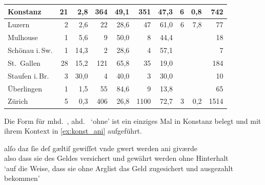 \begin{table}
\begin{tabular}{
	l @{\qquad}
	r r @{\qquad}
	r r @{\qquad}
	r r @{\qquad}
	r r @{\qquad}
	r}
\midrule

Konstanz
	& 21 	& 2,8
	& 364	& 49,1
	& 351	& 47,3
	& 6		& 0,8
	& 742
	\\

\midrule

Luzern
	& 2		& 2,6
	& 22	& 28,6
	& 47	& 61,0
	& 6		& 7,8
	& 77
	\\

\midrule

Mulhouse
	& 1	& 5,6
	& 9	& 50,0
	& 8	& 44,4
	&	&
	& 18
	\\

\midrule

Schönau i.\,Sw.
	& 1	& 14,3
	& 2	& 28,6
	& 4	& 57,1
	&	&
	& 7
	\\

\midrule

St.~Gallen
	& 28	& 15,2
	& 121	& 65,8
	& 35	& 19,0
	&		&
	& 184
	\\

\midrule

Staufen i.\,Br.
	& 3 & 30,0
	& 4	& 40,0
	& 3	& 30,0
	&	&
	& 10
	\\

\midrule

Überlingen
	& 1		& 1,5	
	& 55	& 84,6
	& 9		& 13,8
	&		&
	& 65
	\\

\midrule

Zürich
	& 5		& 0,3
	& 406	& 26,8
	& 1100	& 72,7
	& 3		& 0,2
	& 1514
	\\



\bottomrule
\end{tabular}
\label{tab:ispelx}
\end{table}

Die Form  für mhd.~, ahd.~ `ohne' ist ein einziges
Mal in Konstanz belegt und mit ihrem Kontext in \cref{ex:konst_ani} aufgeführt.

\begin{exe}
\ex\label{ex:konst_ani}
	\gll alſo daz ſie deſ gæltiſ gewiſſet vnde gwert werden ani giværde \\
		also dass sie des Geldes versichert und gewährt werden ohne
			Hinterhalt \\
	\trans `auf die Weise, dass sie ohne Arglist das Geld zugesichert und
		ausgezahlt bekommen'
		\parencites(Nr.~17, Konstanz, 1251)[26,22]{cao1}
\end{exe}

